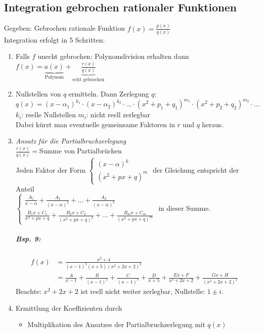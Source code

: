 \subsection{Integration gebrochen rationaler Funktionen}
Gegeben: Gebrochen rationale Funktion $f(x)=\frac{p(x)}{q(x)}$\\
Integration erfolgt in 5 Schritten:
\begin{enumerate}
\item Falls $f$ unecht gebrochen: Polynomdivision erhalten dann $f(x) =\underbrace{a(x)}_{\text{Polynom}} + \underbrace{\frac{r(x)}{q(x)}}_{\text{echt gebrochen}}$
\item Nullstellen von $q$ ermitteln. Dann Zerlegung $q$: \\
$q(x) = (x-\alpha_1)^{k_1}\cdot (x-\alpha_2)^{k_2}\cdot \dots \cdot (x^2+p_1+q_1)^{m_1}\cdot (x^2+p_2+q_2)^{m_2}\cdot \dots$\\
$k_i$: reelle Nullstellen \qquad $m_i$: nicht reell zerlegbar\\
Dabei kürzt man eventuelle gemeinsame Faktoren in $r$ und $q$ heraus.
\item \emph{Ansatz für die Partialbruchzerlegung}\\
$\frac{r(x)}{q(x)}= $Summe von Partialbrüchen\\
Jeden Faktor der Form $\begin{cases}
(x-\alpha)^k\\
(x^2+px+q)^m
\end{cases}$ der Gleichung entspricht der Anteil \\
$\begin{cases}
\frac{A_1}{x-\alpha}+\frac{A_2}{(x-\alpha)^2}+\dots + \frac{A_2}{(x-\alpha)^k}\\
\frac{B_1x+C_1}{x^2+px+q}+\frac{B_2 x + C_2}{(x^2+px+q)^2}+\dots + \frac{B_m x + C_m}{(x^2+px+q)^m}
\end{cases}$ in dieser Summe.
\subparagraph{Bsp. 9:}
\begin{align*}
f(x) &= \frac{x^2+4}{(x-1)^3(x+5)(x^2+2x+2)^2}\\
&=\frac{A}{x-1}+\frac{B}{(x-1)^2}+\frac{C}{(x-1)^3}+ \frac{D}{x+5}+ \frac{Ex+F}{x^2+2x+2}+\frac{Gx+H}{(x^2+2x+2)^2}
\end{align*}
Beachte: $x^2+2x+2$ ist reell nicht weiter zerlegbar, Nullstelle: $1\pm i$.
\item Ermittlung der Koeffizienten durch 
\begin{itemize}
\item Multiplikation des Ansatzes der Partialbruchzerlegung mit $q(x)$

\end{itemize}
\end{enumerate}
